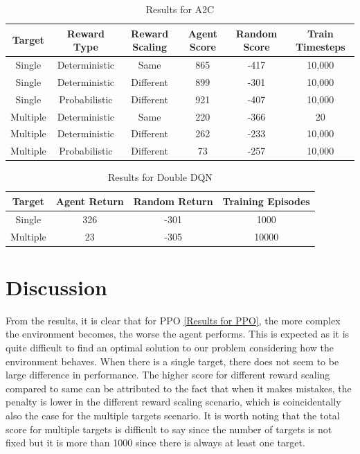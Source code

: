 \documentclass{article}
\begin{document}
	\begin{table}[h]
		\centering
		\caption[]{Results for A2C}\label{Results for A2C}%
		\begin{tabular}{cccccc}
			\toprule
			Target & Reward Type & Reward Scaling & Agent Score & Random Score & Train Timesteps\\
			\midrule
			Single &  Deterministic & Same & 865 & -417 & 10,000\\
			Single & Deterministic & Different & 899 & -301 & 10,000\\
			Single & Probabilistic & Different & 921 & -407 & 10,000\\
			\midrule
			Multiple & Deterministic & Same & 220 & -366 & 20\\
			Multiple & Deterministic & Different & 262 & -233 & 10,000\\
			Multiple & Probabilistic & Different & 73 & -257 & 10,000\\
			\bottomrule
		\end{tabular}
	\end{table}
	
	   \begin{table}[h]
		\centering
		\caption[]{Results for Double DQN}\label{Results for DDQN}%
		\begin{tabular}{cccc}
			\toprule
			Target & Agent Return & Random Return & Training Episodes \\
			\midrule
			Single & 326 & -301 & 1000 \\
			Multiple & 23 & -305 & 10000 \\
			\bottomrule
		\end{tabular}
	\end{table}
	
	\section{Discussion}
	\label{discussion}
	From the results, it is clear that for PPO \ref{Results for PPO}, the more complex the environment becomes, the worse the agent performs. This is expected as it is quite difficult to find an optimal solution to our problem considering how the environment behaves. When there is a single target, there does not seem to be large difference in performance. The higher score for different reward scaling compared to same can be attributed to the fact that when it makes mistakes, the penalty is lower in the different reward scaling scenario, which is coincidentally also the case for the multiple targets scenario. It is worth noting that the total score for multiple targets is difficult to say since the number of targets is not fixed but it is more than 1000 since there is always at least one target.
	
\end{document}

